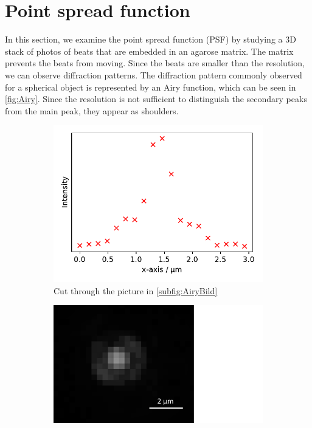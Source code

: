 \section{Point spread function}
\label{sec:PSF}

In this section, we examine the point spread function (PSF) by studying a 3D stack of photos of beats that are
embedded in an agarose matrix. The matrix prevents the beats from moving. Since the beats are smaller
than the resolution, we can observe diffraction patterns. The diffraction pattern commonly observed for a spherical object is represented by an Airy function, which can be seen in \cref{fig:Airy}. 
Since the resolution is not sufficient to distinguish the secondary peaks from the main peak, they appear as shoulders.
\begin{figure}[h]
    \centering
    \begin{subfigure}{0.51\linewidth}
        \centering
        \includegraphics[width = \textwidth]{Bilder/PSF/Airy.pdf}
        \caption{Cut through the picture in \ref*{subfig:AiryBild}}
        \label{subfig:Airy}
    \end{subfigure}
    \hfill
    \begin{subfigure}{0.43\linewidth}
        \centering
        \includegraphics[width = \textwidth]{Bilder/PSF/2DBeugung_cropped.pdf}

\end{subfigure}
\end{figure}
